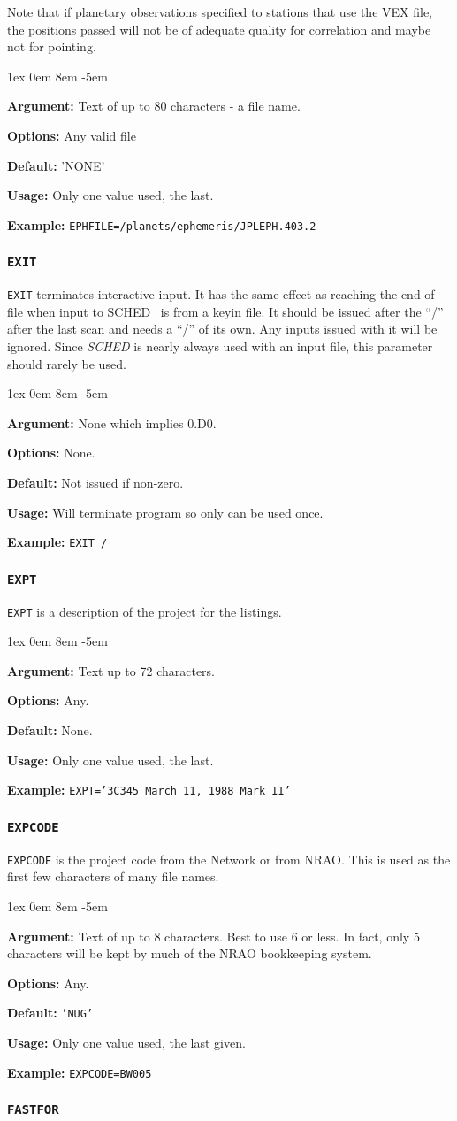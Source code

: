 \documentclass{report}
\newcommand{\schedb}{{\sc SCHED~}}
\newcommand{\rcwbox}[5]{
  \begin{list}{}{\parsep 1ex  \itemsep 0em
                 \leftmargin 8em  \itemindent -5em }
    \item {\bf Argument:} #1
    \item {\bf Options:}  #2
    \item {\bf Default:}  #3
    \item {\bf Usage:}    #4
    \item {\bf Example:}  #5
  \end{list}
}
\begin{document}
Note that if planetary observations specified to stations
that use the VEX file, the positions passed will not be
of adequate quality for correlation and maybe not for pointing.

\rcwbox
{Text of up to 80 characters - a file name.}
{Any valid file}
{'NONE'}
{Only one value used, the last.}
{{\tt EPHFILE=/planets/ephemeris/JPLEPH.403.2}}

\subsubsection{\label{MP:EXIT}{\tt EXIT}}

{\tt EXIT} terminates interactive input. It has
the same effect as reaching the end of file when input to \schedb
is from a keyin file. It should be issued after the ``/'' after the
last scan and needs a ``/'' of its own. Any inputs issued with it will
be ignored.  Since {\em SCHED} is nearly always used with an input file,
this parameter should rarely be used.

\rcwbox
{None which implies 0.D0.}
{None.}
{Not issued if non-zero.}
{Will terminate program so only can be used once.}
{{\tt EXIT /}}

\subsubsection{\label{MP:EXPT}{\tt EXPT}}

{\tt EXPT} is a description of the project for the listings.

\rcwbox
{Text up to 72 characters.}
{Any.}
{None.}
{Only one value used, the last.}
{{\tt EXPT='3C345 March 11, 1988 Mark II'}}


\subsubsection{\label{MP:EXPCODE}{\tt EXPCODE}}

{\tt EXPCODE} is the project code from the Network or from NRAO.
This is used as the first few characters of many file names.


\rcwbox
{Text of up to 8 characters. Best to use 6 or less.  In fact, only
5 characters will be kept by much of the NRAO bookkeeping system.}
{Any.}
{{\tt 'NUG'}}
{Only one value used, the last given.}
{{\tt EXPCODE=BW005}}


\subsubsection{\label{MP:FASTFOR}{\tt FASTFOR}}
\end{document}

